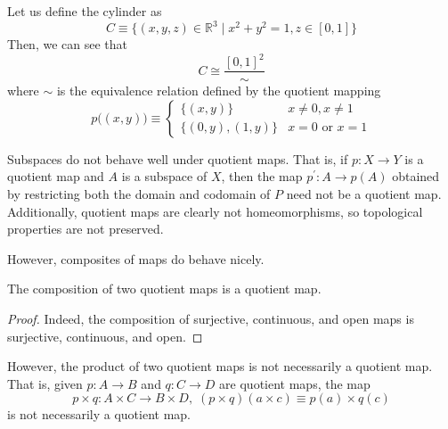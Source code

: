     \begin{example}
    Let us define the cylinder as 
    \[C \equiv \{(x, y, z) \in \mathbb{R}^3 \; | \; x^2 + y^2 = 1, z \in [0,1]\} \]
    Then, we can see that
    \[C \cong \frac{[0,1]^2}{\sim}\]
    where $\sim$ is the equivalence relation defined by the quotient mapping 
    \[p\big((x, y)\big) \equiv \begin{cases}
          \{(x, y)\} & x \neq 0, x \neq 1 \\
          \{(0,y), (1, y)\} & x = 0 \text{ or } x = 1
    \end{cases}\]
    \end{example}

    Subspaces do not behave well under quotient maps. That is, if $p: X \longrightarrow Y$ is a quotient map and $A$ is a subspace of $X$, then the map $p^\prime: A \longrightarrow p(A)$ obtained by restricting both the domain and codomain of $P$ need not be a quotient map. Additionally, quotient maps are clearly not homeomorphisms, so topological properties are not preserved. 

    However, composites of maps do behave nicely. 

    \begin{proposition}
    The composition of two quotient maps is a quotient map. 
    \end{proposition}
    \begin{proof}
    Indeed, the composition of surjective, continuous, and open maps is surjective, continuous, and open. 
    \end{proof}

    However, the product of two quotient maps is not necessarily a quotient map. That is, given $p: A \longrightarrow B$ and $q: C \longrightarrow D$ are quotient maps, the map 
    \[p \times q: A \times C \longrightarrow B \times D, \; (p \times q) (a \times c) \equiv p(a) \times q(c)\]
    is not necessarily a quotient map. 

